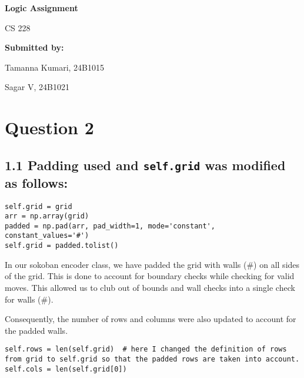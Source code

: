 \documentclass[12pt,a4paper]{article}
\begin{document}
\begin{titlepage}
    \centering
    \vspace*{2cm}
    
    {\LARGE \textbf{Logic Assignment} \par}
    \vspace{0.5cm}
    {\Large CS 228 \par}
    
    \vspace{4cm}
    
    \textbf{Submitted by:} \par
    Tamanna Kumari, 24B1015 \par
    Sagar V, 24B1021 \par
    
    \vfill
\end{titlepage}

\newpage

\section*{Question 2}

\subsection*{1.1 Padding used and \texttt{self.grid} was modified as follows:}

\begin{lstlisting}
self.grid = grid
arr = np.array(grid)
padded = np.pad(arr, pad_width=1, mode='constant', constant_values='#')
self.grid = padded.tolist()
\end{lstlisting}

In our sokoban encoder class, we have padded the grid with walls (\#) on all sides of the grid. This is done to account for boundary checks while checking for valid moves. This allowed us to club out of bounds and wall checks into a single check for walls (\#).

Consequently, the number of rows and columns were also updated to account for the padded walls.

\begin{lstlisting}
self.rows = len(self.grid)  # here I changed the definition of rows from grid to self.grid so that the padded rows are taken into account.
self.cols = len(self.grid[0]) 
\end{lstlisting}
\end{document}
